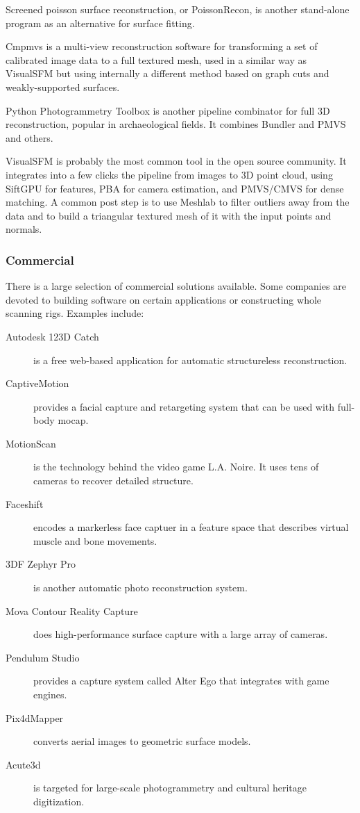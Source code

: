 Screened poisson surface reconstruction, or PoissonRecon, is another stand-alone program as an alternative for surface fitting. \cite{kazhdan2013screened}

Cmpmvs is a multi-view reconstruction software for transforming a set of calibrated image data to a full textured mesh, used in a similar way as VisualSFM but using internally a different method based on graph cuts and weakly-supported surfaces.
\cite{jancosek2011multi}

Python Photogrammetry Toolbox is another pipeline combinator for full 3D reconstruction, popular in archaeological fields. It combines Bundler and PMVS and others. \cite{moulon2011python}

VisualSFM is probably the most common tool in the open source community.
It integrates into a few clicks the pipeline from images to 3D point cloud, using SiftGPU for features, PBA for camera estimation, and PMVS/CMVS for dense matching.
A common post step is to use Meshlab to filter outliers away from the data and to build a triangular textured mesh of it with the input points and normals.



\subsubsection{Commercial} %

There is a large selection of commercial solutions available. Some companies are devoted to building software on certain applications or constructing whole scanning rigs. Examples include:
\begin{description}
\item[Autodesk 123D Catch] is a free web-based application for automatic structureless reconstruction.
\item[CaptiveMotion] provides a facial capture and retargeting system that can be used with full-body mocap.
\item[MotionScan] is the technology behind the video game L.A. Noire. \cite{rockstar2011noire} It uses tens of cameras to recover detailed structure.
\item[Faceshift] encodes a markerless face captuer in a feature space that describes virtual muscle and bone movements.
\item[3DF Zephyr Pro] is another automatic photo reconstruction system.
\item[Mova Contour Reality Capture] does high-performance surface capture with a large array of cameras.
\item[Pendulum Studio] provides a capture system called Alter Ego that integrates with game engines.
\item[Pix4dMapper] converts aerial images to geometric surface models.
\item[Acute3d] is targeted for large-scale photogrammetry and cultural heritage digitization.
\end{description}

